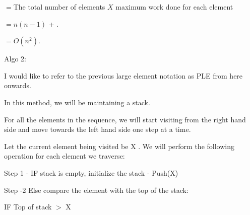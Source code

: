 \documentclass[letterpaper,portrait,12pt]{article}
\begin{document}
\begin{flushleft}
$= $The total number of elements $X$ maximum work done for each element
\end{flushleft}


\begin{flushleft}
$= n (n-1)$ + .
\end{flushleft}


\begin{flushleft}
$= O(n^2)$.
\end{flushleft}


\begin{flushleft}

\end{flushleft}


\begin{flushleft}
Algo 2:
\end{flushleft}


\begin{flushleft}
I would like to refer to the previous large element notation as PLE from here onwards.
\end{flushleft}


\begin{flushleft}
	
\end{flushleft}


\begin{flushleft}
In this method, we will be maintaining a stack. 
\end{flushleft}


\begin{flushleft}
For all the elements in the sequence, we will start visiting from the right hand side and move towards the left hand side one step at a time.
\end{flushleft}


\begin{flushleft}
Let the current element being visited be X . We will perform the following operation for each element we traverse:
\end{flushleft}


\begin{flushleft}
Step 1 - IF stack is empty, initialize the stack - Push(X)
\end{flushleft}


\begin{flushleft}
Step -2  Else compare the element with the top of the stack:
\end{flushleft}


\begin{flushleft}
	 IF Top of stack $>$ X
\end{flushleft}
\end{document}
